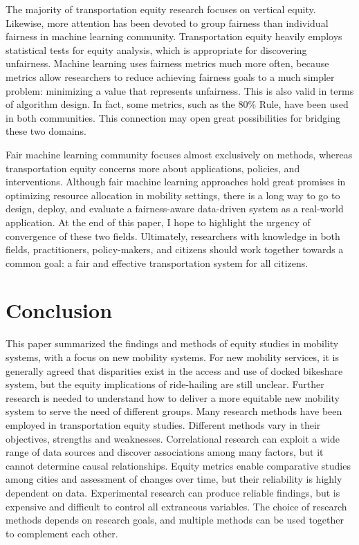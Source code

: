 \documentclass[11pt]{article}
\begin{document}
The majority of transportation equity research focuses on vertical equity. Likewise, more attention has been devoted to group fairness than individual fairness in machine learning community. Transportation equity heavily employs statistical tests for equity analysis, which is appropriate for discovering unfairness. Machine learning uses fairness metrics much more often, because metrics allow researchers to reduce achieving fairness goals to a much simpler problem: minimizing a value that represents unfairness. This is also valid in terms of algorithm design. In fact, some metrics, such as the 80\% Rule, have been used in both communities. This connection may open great possibilities for bridging these two domains.   

Fair machine learning community focuses almost exclusively on methods, whereas transportation equity concerns more about applications, policies, and interventions. Although fair machine learning approaches hold great promises in optimizing resource allocation in mobility settings, there is a long way to go to design, deploy, and evaluate a fairness-aware data-driven system as a real-world application. At the end of this paper, I hope to highlight the urgency of convergence of these two fields. Ultimately, researchers with knowledge in both fields, practitioners, policy-makers, and citizens should work together towards a common goal: a fair and effective transportation system for  all citizens. 


\section{Conclusion}
This paper summarized the findings and methods of equity studies in mobility systems, with a focus on new mobility systems. For new mobility services, it is generally agreed that disparities exist in the access and use of docked bikeshare system, but the equity implications of ride-hailing are still unclear. Further research is needed to understand how to deliver a more equitable new mobility system to serve the need of different groups. Many research methods have been employed in transportation equity studies. Different methods vary in their objectives, strengths and weaknesses. Correlational research can exploit a wide range of data sources and discover associations among many factors, but it cannot determine causal relationships. Equity metrics enable comparative studies among cities and assessment of changes over time, but their reliability is highly dependent on data. Experimental research can produce reliable findings, but is expensive and difficult to control all extraneous variables. The choice of research methods depends on research goals, and multiple methods can be used together to complement each other. 
\end{document}
